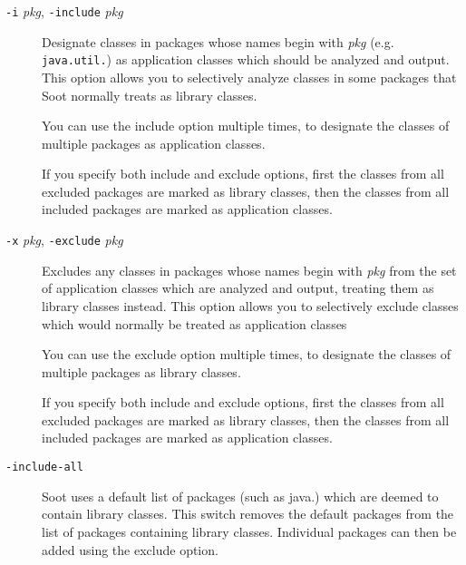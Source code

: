 \documentclass{article}
\begin{document}
\begin{description}

  \item[
  {\tt -i}{ \it pkg}, 
  {\tt -include}{ \it pkg}]


\par

Designate classes in packages whose names begin with
{\it pkg} (e.g. {\tt java.util.}) as application
classes which should be analyzed and output. This option allows
you to selectively analyze classes in some packages that Soot
normally treats as library classes.

\par

You can use the include option multiple times, to designate
the classes of multiple packages as application classes.

\par

If you specify both include and exclude options, first the
classes from all excluded packages are marked as library classes,
then the classes from all included packages are marked as
application classes.



  \item[
  {\tt -x}{ \it pkg}, 
  {\tt -exclude}{ \it pkg}]


\par

Excludes any classes in packages whose names begin with
{\it pkg} from the set of application classes which are
analyzed and output, treating them as library classes instead.
This option allows you to selectively exclude classes
which would normally be treated as application classes


\par

You can use the exclude option multiple times, to designate
the classes of multiple packages as library classes.

\par

If you specify both include and exclude options, first the
classes from all excluded packages are marked as library classes,
then the classes from all included packages are marked as
application classes.



  \item[
  {\tt -include-all}]

Soot uses a default list of packages (such as java.) which are deemed
to contain library classes. This switch removes the default packages from the
list of packages containing library classes.
Individual packages can then be added using the exclude option.




\end{description}
\end{document}
